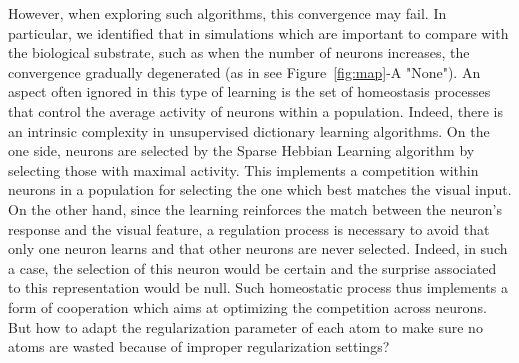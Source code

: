 \documentclass[vision,article,submit,oneauthor,pdftex]{Definitions/mdpi}
\begin{document}
However, when exploring such algorithms, this convergence may fail. In particular, we identified that in simulations which are important to compare with the biological substrate, such as when the number of neurons increases, the convergence gradually degenerated (as in see Figure~\ref{fig:map}-A "None"). An aspect often ignored in this type of learning is the set of homeostasis processes that control the average activity of neurons within a population. Indeed, there is an intrinsic complexity in unsupervised dictionary learning algorithms. On the one side, neurons are selected by the Sparse Hebbian Learning algorithm by selecting those with maximal activity. This implements a competition within neurons in a population for selecting the one which best matches the visual input. On the other hand, since the learning reinforces the match between the neuron's response and the visual feature, a regulation process is necessary to avoid that only one neuron learns and that other neurons are never selected. Indeed, in such a case, the selection of this neuron would be certain and the surprise associated to this representation would be null. Such homeostatic process thus implements a form of cooperation which aims at optimizing the competition across neurons. But how to adapt the regularization parameter of each atom to make sure no atoms are wasted because of improper regularization settings? 
\end{document}
